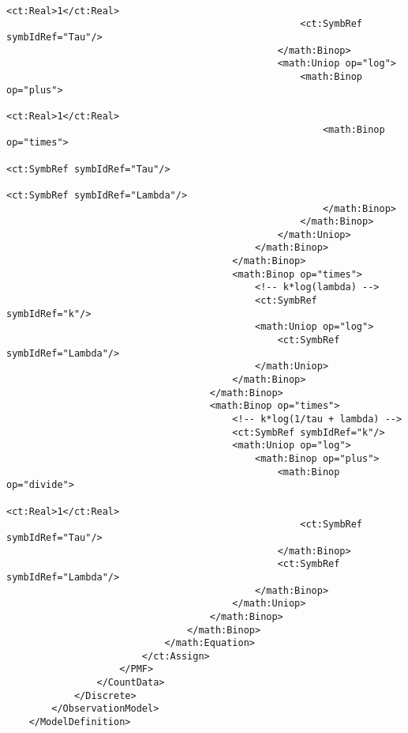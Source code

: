 \begin{lstlisting}
                                                    <ct:Real>1</ct:Real>
                                                    <ct:SymbRef symbIdRef="Tau"/>
                                                </math:Binop>
                                                <math:Uniop op="log">
                                                    <math:Binop op="plus">
                                                        <ct:Real>1</ct:Real>
                                                        <math:Binop op="times">
                                                            <ct:SymbRef symbIdRef="Tau"/>
                                                            <ct:SymbRef symbIdRef="Lambda"/>
                                                        </math:Binop>
                                                    </math:Binop>
                                                </math:Uniop>
                                            </math:Binop>
                                        </math:Binop>
                                        <math:Binop op="times">
                                            <!-- k*log(lambda) -->
                                            <ct:SymbRef symbIdRef="k"/>                         
                                            <math:Uniop op="log">
                                                <ct:SymbRef symbIdRef="Lambda"/>
                                            </math:Uniop>
                                        </math:Binop>
                                    </math:Binop>
                                    <math:Binop op="times">
                                        <!-- k*log(1/tau + lambda) -->
                                        <ct:SymbRef symbIdRef="k"/>                         
                                        <math:Uniop op="log">
                                            <math:Binop op="plus">
                                                <math:Binop op="divide">
                                                    <ct:Real>1</ct:Real>
                                                    <ct:SymbRef symbIdRef="Tau"/>
                                                </math:Binop>
                                                <ct:SymbRef symbIdRef="Lambda"/>
                                            </math:Binop>
                                        </math:Uniop>
                                    </math:Binop>
                                </math:Binop>
                            </math:Equation>
                        </ct:Assign>
                    </PMF>
                </CountData>
            </Discrete>
        </ObservationModel>
    </ModelDefinition>
\end{lstlisting}



